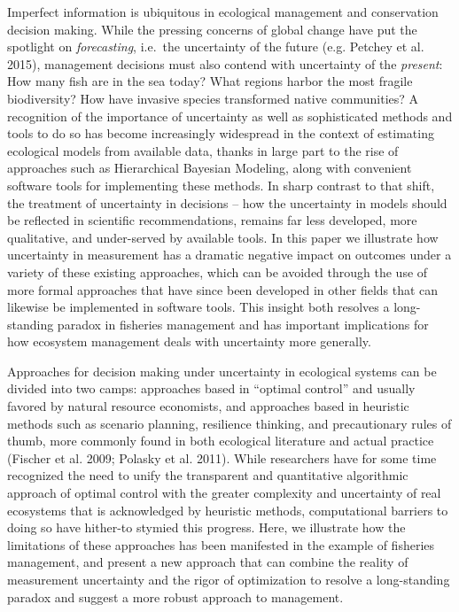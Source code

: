 \documentclass[3p]{elsarticle} %
\begin{document}
Imperfect information is ubiquitous in ecological management and
conservation decision making. While the pressing concerns of global
change have put the spotlight on \emph{forecasting}, i.e.~the
uncertainty of the future (e.g. Petchey et al. 2015), management
decisions must also contend with uncertainty of the \emph{present}: How
many fish are in the sea today? What regions harbor the most fragile
biodiversity? How have invasive species transformed native communities?
A recognition of the importance of uncertainty as well as sophisticated
methods and tools to do so has become increasingly widespread in the
context of estimating ecological models from available data, thanks in
large part to the rise of approaches such as Hierarchical Bayesian
Modeling, along with convenient software tools for implementing these
methods. In sharp contrast to that shift, the treatment of uncertainty
in decisions -- how the uncertainty in models should be reflected in
scientific recommendations, remains far less developed, more
qualitative, and under-served by available tools. In this paper we
illustrate how uncertainty in measurement has a dramatic negative impact
on outcomes under a variety of these existing approaches, which can be
avoided through the use of more formal approaches that have since been
developed in other fields that can likewise be implemented in software
tools. This insight both resolves a long-standing paradox in fisheries
management and has important implications for how ecosystem management
deals with uncertainty more generally.

Approaches for decision making under uncertainty in ecological systems
can be divided into two camps: approaches based in ``optimal control''
and usually favored by natural resource economists, and approaches based
in heuristic methods such as scenario planning, resilience thinking, and
precautionary rules of thumb, more commonly found in both ecological
literature and actual practice (Fischer et al. 2009; Polasky et al.
2011). While researchers have for some time recognized the need to unify
the transparent and quantitative algorithmic approach of optimal control
with the greater complexity and uncertainty of real ecosystems that is
acknowledged by heuristic methods, computational barriers to doing so
have hither-to stymied this progress. Here, we illustrate how the
limitations of these approaches has been manifested in the example of
fisheries management, and present a new approach that can combine the
reality of measurement uncertainty and the rigor of optimization to
resolve a long-standing paradox and suggest a more robust approach to
management.
\end{document}

